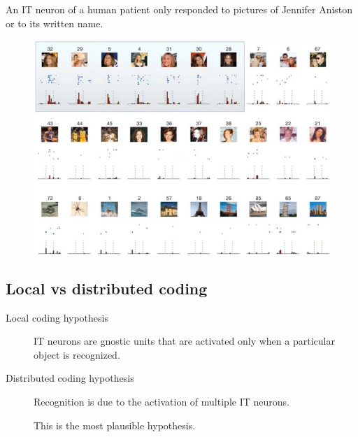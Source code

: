 \begin{casestudy}
    An IT neuron of a human patient only responded to pictures of Jennifer Aniston or to its written name.
    \begin{figure}[H]
        \centering
        \includegraphics[width=0.5\linewidth]{./img/aniston_cell.png}
    \end{figure}
\end{casestudy}



\subsection{Local vs distributed coding}


\begin{description}
    \item[Local coding hypothesis] 
        IT neurons are gnostic units that are activated only when a particular object is recognized.

    \item[Distributed coding hypothesis] 
        Recognition is due to the activation of multiple IT neurons.
        \begin{remark}
            This is the most plausible hypothesis.
        \end{remark}
\end{description}


